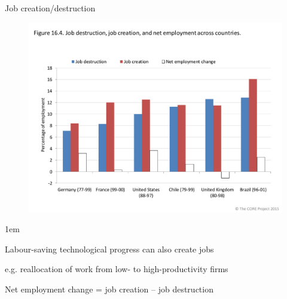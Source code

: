 \documentclass[11pt,aspectratio=43,usenames,dvipsnames]{beamer}
\let\olditemize=\itemize
\let\endolditemize=\enditemize
\renewenvironment{itemize}{\olditemize \itemsep1em}{\endolditemize}
\theoremstyle{definition}
\begin{document}
\begin{frame}{Job creation/destruction}
\label{slide:Job_creation_destruction}
    \begin{figure}
        \centering
        \includegraphics[width=.6\textwidth]{./figures/6.pdf}
    \end{figure}
    \begin{itemize}
        \item Labour-saving technological progress can also create jobs
        \item e.g. reallocation of work from low- to high-productivity firms
        \item Net employment change = job creation – job destruction
    \end{itemize}
\end{frame}
\end{document}
